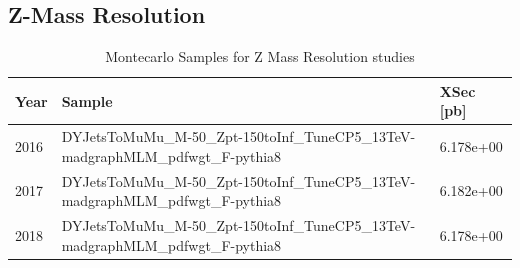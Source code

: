 
\subsection{Z-Mass Resolution}

\begin{table}
\begin{center}
  \caption{Montecarlo Samples for Z Mass Resolution studies}
\footnotesize
\begin{tabular}{|l|l|l|}
\hline
Year & Sample & XSec [pb] \\ \hline
\hline
2016 & DYJetsToMuMu\_M-50\_Zpt-150toInf\_TuneCP5\_13TeV-madgraphMLM\_pdfwgt\_F-pythia8 & 6.178e+00\\
\hline
2017 & DYJetsToMuMu\_M-50\_Zpt-150toInf\_TuneCP5\_13TeV-madgraphMLM\_pdfwgt\_F-pythia8 & 6.182e+00\\
\hline
2018 & DYJetsToMuMu\_M-50\_Zpt-150toInf\_TuneCP5\_13TeV-madgraphMLM\_pdfwgt\_F-pythia8 & 6.178e+00\\
\hline
\end{tabular}
\label{tab:ZMassResolutionSamples}
\end{center}
\end{table}
